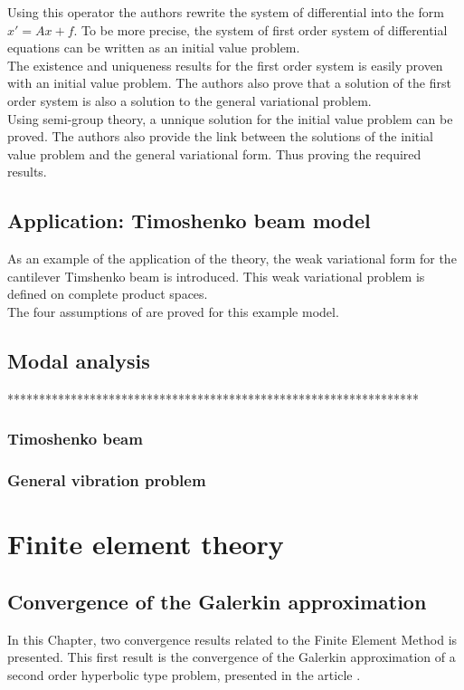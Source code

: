 \documentclass[../main.tex]{subfiles}
\begin{document}
Using this operator the authors rewrite the system of differential into the form $\displaystyle x' = Ax + f$. To be more precise, the system of first order system of differential equations can be written as an initial value problem.\\

The existence and uniqueness results for the first order system is easily proven with an initial value problem. The authors also prove that a solution of the first order system is also a solution to the general variational problem.\\

Using semi-group theory, a unnique solution for the initial value problem can be proved. The authors also provide the link between the solutions of the initial value problem and the general variational form. Thus proving the required results.

\subsection{Application: Timoshenko beam model}
As an example of the application of the theory, the weak variational form for the cantilever Timshenko beam is introduced. This weak variational problem is defined on complete product spaces.\\

The four assumptions of \cite{LVV09} are proved for this example model.

\subsection{Modal analysis}
*****************************************************************

\subsubsection{Timoshenko beam}
\subsubsection{General vibration problem}
\section{Finite element theory}

\subsection{Convergence of the Galerkin approximation}
In this Chapter, two convergence results related to the Finite Element Method is presented. This first result is the convergence of the Galerkin approximation of a second order hyperbolic type problem, presented in the article \cite{BV13}.\\
\end{document}
